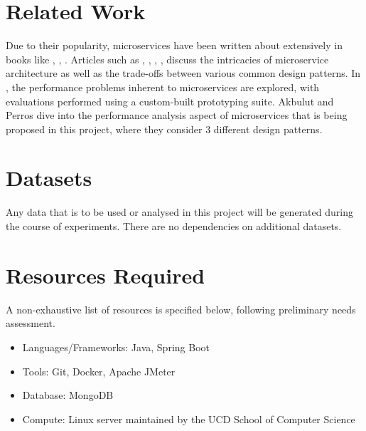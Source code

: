 \section{Related Work}
Due to their popularity, microservices have been written about extensively in books like \cite{richardson18}, \cite{kleppmann17}, \cite{newman14}. Articles such as \cite{md19}, \cite{md20}, \cite{sahiti20}, \cite{udantha19}, \cite{lewis14} discuss the intricacies of microservice architecture as well as the trade-offs between various common design patterns. In \cite{cully20}, the performance problems inherent to microservices are explored, with evaluations performed using a custom-built prototyping suite. Akbulut and Perros \cite{akbulut19} dive into the performance analysis aspect of microservices that is being proposed in this project, where they consider 3 different design patterns.

\section{Datasets}
Any data that is to be used or analysed in this project will be generated during the course of experiments. There are no dependencies on additional datasets.

\section{Resources Required}
A non-exhaustive list of resources is specified below, following preliminary needs assessment.

\begin{itemize}
	\item Languages/Frameworks: Java, Spring Boot
	\item Tools: Git, Docker, Apache JMeter
	\item Database: MongoDB
	\item Compute: Linux server maintained by the UCD School of Computer Science
\end{itemize}

